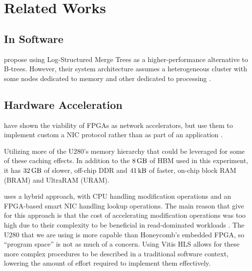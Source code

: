 \chapter{Related Works}

\section{In Software}

\citeauthor{dlsm} propose using Log-Structured Merge Trees as a higher-performance alternative to B-trees. However, their system architecture assumes a heterogeneous cluster with some nodes dedicated to memory and other dedicated to processing \autocite{dlsm}.


\section{Hardware Acceleration}

\citeauthor{star} have shown the viability of FPGAs as network accelerators, but use them to implement custom a NIC protocol rather than as part of an application \autocite{star}.

Utilizing more of the U280's memory hierarchy that could be leveraged for some of these caching effects. In addition to the $\SI{8}{\giga\byte}$ of HBM used in this experiment, it has $\SI{32}{\giga\byte}$ of slower, off-chip DDR and $\SI{41}{\kilo\byte}$ of faster, on-chip block RAM (BRAM) and UltraRAM (URAM).

 uses a hybrid approach, with CPU handling modification operations and an FPGA-based smart NIC handling lookup operations. The main reason that \citeauthor{honeycomb} give for this approach is that the cost of accelerating modification operations was too high due to their complexity to be beneficial in read-dominated workloads \autocite{honeycomb}. The U280 that we are using is more capable than Honeycomb's embedded FPGA, so ``program space'' is not as much of a concern. Using Vitis HLS allows for these more complex procedures to be described in a traditional software context, lowering the amount of effort required to implement them effectively.
